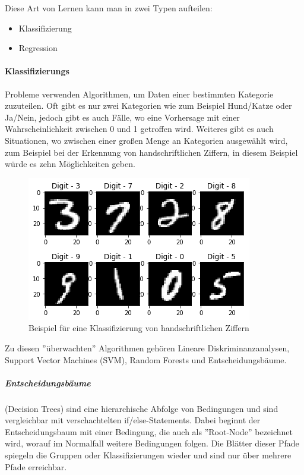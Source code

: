 Diese Art von Lernen kann man in zwei Typen aufteilen:

\begin{itemize}
      \item Klassifizierung
      \item Regression
\end{itemize}

\paragraph{Klassifizierungs} Probleme verwenden Algorithmen, um Daten einer bestimmten Kategorie zuzuteilen. Oft gibt es nur zwei Kategorien wie zum Beispiel Hund/Katze oder Ja/Nein, jedoch gibt es auch Fälle, wo eine Vorhersage mit einer Wahrscheinlichkeit zwischen 0 und 1 getroffen wird. Weiteres gibt es auch Situationen, wo zwischen einer großen Menge an Kategorien ausgewählt wird, zum Beispiel bei der Erkennung von handschriftlichen Ziffern, in diesem Beispiel würde es zehn Möglichkeiten geben.

\begin{figure}[H]
      \centering
      \includegraphics{sections/machine-learning/images/0_8-vKSQnZvKbtKXKy.png}
      \caption{Beispiel für eine Klassifizierung von handschriftlichen Ziffern}
      \label{ziffern}
\end{figure}

Zu diesen ''überwachten'' Algorithmen gehören Lineare Diskriminanzanalysen, Support Vector Machines (SVM), Random Forests und Entscheidungsbäume.\cite{SL:online}

\subparagraph{Entscheidungsbäume} (Decision Trees) sind eine hierarchische Abfolge von Bedingungen und sind vergleichbar mit verschachtelten if/else-Statements. Dabei beginnt der Entscheidungsbaum mit einer Bedingung, die auch als ''Root-Node'' bezeichnet wird, worauf im Normalfall weitere Bedingungen folgen. Die Blätter dieser Pfade spiegeln die Gruppen oder Klassifizierungen wieder und sind nur über mehrere Pfade erreichbar.

